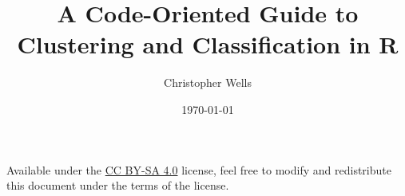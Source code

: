 \documentclass[a4paper,12pt]{book}
\begin{document}
\author{Christopher Wells}
\title{A Code-Oriented Guide to Clustering and Classification in R}
\date{\today}

\frontmatter
\maketitle

Available under the \href{https://creativecommons.org/licenses/by-sa/4.0/}{CC BY-SA 4.0} license, feel free to modify and redistribute this document under the terms of the license.
\tableofcontents

\mainmatter



\backmatter
\end{document}
